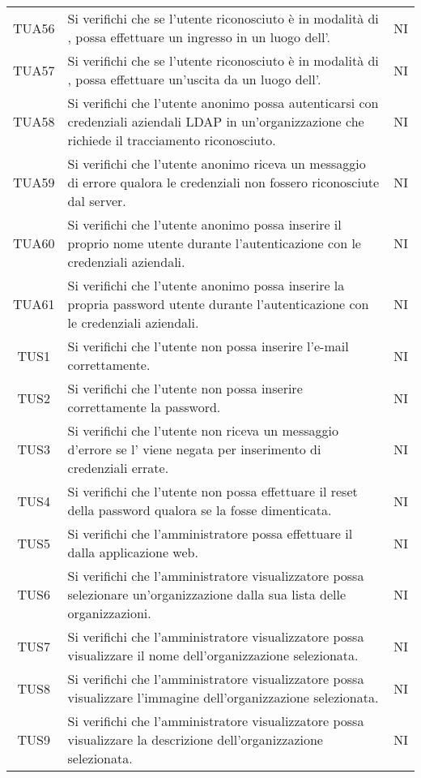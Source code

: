 {\begin{longtable}{ c C{13cm} C{1cm}}
TUA56 & Si verifichi che se l'utente riconosciuto è in modalità di , possa effettuare un ingresso in un luogo dell'. & NI \\
TUA57 & Si verifichi che se l'utente riconosciuto è in modalità di , possa effettuare un'uscita da un luogo dell'. & NI \\
TUA58 & Si verifichi che l’utente anonimo possa autenticarsi con credenziali aziendali LDAP in un'organizzazione che richiede il tracciamento riconosciuto. & NI \\
TUA59 & Si verifichi che l’utente anonimo riceva un messaggio di errore qualora le credenziali  non fossero riconosciute dal server. & NI \\
TUA60 & Si verifichi che l’utente anonimo possa inserire il proprio nome utente durante l'autenticazione con le credenziali  aziendali. & NI \\
TUA61 & Si verifichi che l’utente anonimo possa inserire la propria password utente durante l'autenticazione con le credenziali  aziendali. & NI \\
TUS1 & Si verifichi che l’utente non  possa inserire l'e-mail correttamente. & NI \\
TUS2 & Si verifichi che l’utente non  possa inserire correttamente la password. & NI \\
TUS3 & Si verifichi che l’utente non  riceva un messaggio d'errore se l' viene negata per inserimento di credenziali errate. & NI \\
TUS4 & Si verifichi che l’utente non  possa effettuare il reset della password qualora se la fosse dimenticata. & NI \\
TUS5 & Si verifichi che l'amministratore  possa effettuare il  dalla applicazione web. & NI \\
TUS6 & Si verifichi che l’amministratore visualizzatore possa selezionare un’organizzazione dalla sua lista delle organizzazioni. & NI \\
TUS7 & Si verifichi che l'amministratore visualizzatore possa visualizzare il nome dell'organizzazione selezionata. & NI \\
TUS8 & Si verifichi che l'amministratore visualizzatore possa visualizzare l’immagine dell'organizzazione selezionata. & NI \\
TUS9 & Si verifichi che l'amministratore visualizzatore possa visualizzare la descrizione dell'organizzazione selezionata. & NI \\

\end{longtable}}

